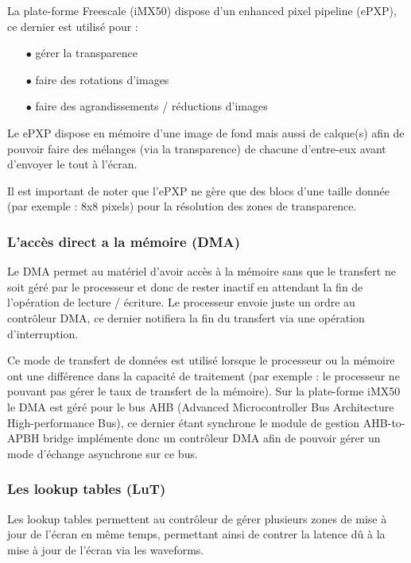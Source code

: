 La plate-forme Freescale (iMX50) dispose d'un enhanced pixel pipeline (ePXP), ce dernier est utilisé pour : 
	\begin{itemize}
		\item[$\bullet$] gérer la transparence
		\item[$\bullet$] faire des rotations d'images
		\item[$\bullet$] faire des agrandissements / réductions d'images\\
	\end{itemize}

Le ePXP dispose en mémoire d'une image de fond mais aussi de calque(s) afin de pouvoir faire des 
mélanges (via la transparence) de chacune d'entre-eux avant d'envoyer le tout à l'écran.

Il est important de noter que l'ePXP ne gère que des blocs d'une taille donnée (par exemple : 8x8 pixels) pour la résolution des zones de transparence.

\subsubsection{L'accès direct a la mémoire (DMA)}

Le DMA permet au matériel d'avoir accès à la mémoire sans que le transfert ne soit géré par le processeur et donc de rester inactif en attendant la fin de l'opération de lecture / écriture.
Le processeur envoie juste un ordre au contrôleur DMA, ce dernier notifiera la fin du transfert via une opération d'interruption.

Ce mode de transfert de données est utilisé lorsque le processeur ou la mémoire ont une différence dans la capacité de traitement (par exemple : le processeur ne pouvant pas gérer le taux de transfert de la mémoire).
Sur la plate-forme iMX50 le DMA est géré pour le bus AHB (Advanced Microcontroller Bus Architecture High-performance Bus), ce dernier étant synchrone le module de gestion AHB-to-APBH bridge implémente donc un contrôleur DMA afin de pouvoir gérer un mode d'échange asynchrone sur ce bus.

\subsubsection{Les lookup tables (LuT)}

Les lookup tables permettent au contrôleur de gérer plusieurs zones de mise à jour de l'écran en même temps, permettant ainsi de contrer la latence dû à la mise à jour de l'écran via les waveforms.

